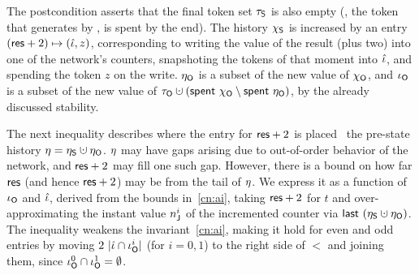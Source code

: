 The postcondition asserts that the final token set $\tau_{\mathsf{S}}$ is also
empty (\ie, the token that  generates by ,
is spent by the end). The history $\chi_{\mathsf{S}}$ is increased by an entry
$(\mathsf{res} + 2) \mapsto (\hat{\iota}, z)$, corresponding to writing the value of
the result (plus two) into one of the network's counters, snapshoting
the tokens of that moment into $\hat{\iota}$, and spending the token $z$ on
the write. $\eta_{\mathsf{O}}$ is a subset of the new value of $\chi_{\mathsf{O}}$, and
$\iota_{\mathsf{O}}$ is a subset of the new value of $\tkno \hunion (\Tomb~\histo
\setminus \Tomb~\gisto)$, by the already discussed stability.

The next inequality describes where the entry for $\mathsf{res} + 2$ is placed
\wrt~the pre-state history $\gist = \gists \hunion \gisto$. $\eta$
may have gaps arising due to out-of-order behavior of the network, and
$\mathsf{res} + 2$ may fill one such gap. However, there is a bound on how far
$\mathsf{res}$ (and hence $\mathsf{res}+2$) may be from the tail of $\eta$. We
express it as a function of $\iota_{\mathsf{O}}$ and $\hat{\iota}$, derived from the
bounds in~\ref{cn:ai}, taking $\mathsf{res} + 2$ for $t$ and
over-approximating the instant value $n_{{\mathsf{J}}}^i$ of the
incremented counter via $\last~(\gists \hunion \gisto)$. The
inequality weakens the invariant~\ref{cn:ai}, making it hold for even
and odd entries by moving $2~|\hat{\iota} \cap \iota_{\mathsf{O}}^i|$ (for $i = 0,1$) to
the right side of $<$ and joining them, since $\iota_{\mathsf{O}}^0 \cap \iota_{\mathsf{O}}^1 =
\emptyset$.


